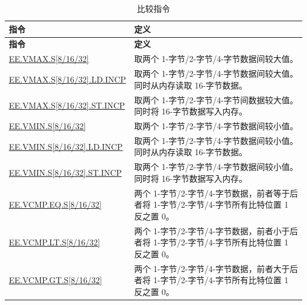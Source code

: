 \begin{longtable}[c]{|l|m{10cm}|}
    \caption{比较指令}
    \label{tab:pie-comparison-instructions}\\
    \hline
    \rowcolor{lightgray}
    \textbf{指令} & \textbf{定义} \\\hline
    \endfirsthead
    \rowcolor{lightgray}
    \textbf{指令} & \textbf{定义} \\\hline
    \endhead
    \endfoot
    
    \hyperref[instruction:EEVMAXS8]{EE.VMAX.S[8/16/32]} & 取两个 1-字节/2-字节/4-字节数据间较大值。
    \\\hline
    \hyperref[instruction:EEVMAXS8LDINCP]{EE.VMAX.S[8/16/32].LD.INCP} & 取两个 1-字节/2-字节/4-字节数据间较大值。同时从内存读取 16-字节数据。
    \\\hline
    \hyperref[instruction:EEVMAXS8STINCP]{EE.VMAX.S[8/16/32].ST.INCP} & 取两个 1-字节/2-字节/4-字节间数据较大值。同时将 16-字节数据写入内存。
    \\\hline
    \hyperref[instruction:EEVMINS8]{EE.VMIN.S[8/16/32]} & 取两个 1-字节/2-字节/4-字节数据间较小值。
    \\\hline
    \hyperref[instruction:EEVMINS8LDINCP]{EE.VMIN.S[8/16/32].LD.INCP} & 取两个 1-字节/2-字节/4-字节数据间较小值。同时从内存读取 16-字节数据。
    \\\hline
    \hyperref[instruction:EEVMINS8STINCP]{EE.VMIN.S[8/16/32].ST.INCP} & 取两个 1-字节/2-字节/4-字节数据间较小值。同时将 16-字节数据写入内存。
    \\\hline
    \hyperref[instruction:EEVCMPEQS8]{EE.VCMP.EQ.S[8/16/32]} & 两个 1-字节/2-字节/4-字节数据，前者等于后者将 1-字节/2-字节/4-字节所有比特位置 1 反之置 0。
    \\\hline
    \hyperref[instruction:EEVCMPLTS8]{EE.VCMP.LT.S[8/16/32]} & 两个 1-字节/2-字节/4-字节数据，前者小于后者将 1-字节/2-字节/4-字节所有比特位置 1 反之置 0。
    \\\hline
    \hyperref[instruction:EEVCMPGTS8]{EE.VCMP.GT.S[8/16/32]} & 两个 1-字节/2-字节/4-字节数据，前者大于后者将 1-字节/2-字节/4-字节所有比特位置 1 反之置 0。
    \\\hline
\end{longtable}